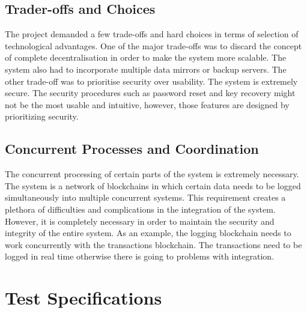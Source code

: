 \documentclass[a4paper,twoside,phd]{BYUPhys}
\begin{document}
\subsection{Trader-offs and Choices}
The project demanded a few trade-offs and hard choices in terms of selection of technological advantages. One of the major trade-offs was to discard the concept of complete decentralisation in order to make the system more scalable. The system also had to incorporate multiple data mirrors or backup servers. The other trade-off was to prioritise security over usability. The system is extremely secure. The security procedures such as password reset and key recovery might not be the most usable and intuitive, however, those features are designed by prioritizing security.
\subsection{Concurrent Processes and Coordination}
The concurrent processing of certain parts of the system is extremely necessary. The system is a network of blockchains in which certain data needs to be logged simultaneously into multiple concurrent systems. This requirement creates a plethora of difficulties and complications in the integration of the system. However, it is completely necessary in order to maintain the security and integrity of the entire system. As an example, the logging blockchain needs to work concurrently with the transactions blockchain. The transactions need to be logged in real time otherwise there is going to problems with integration.

\section{Test Specifications}
\end{document}
